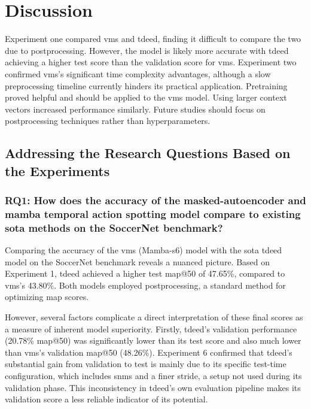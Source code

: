 \chapter{Discussion}
\label{chap:discussion}

Experiment one compared \acrfull{vms} and \acrfull{tdeed}, finding it difficult to compare the two due to postprocessing. However, the model is likely more accurate with \acrshort{tdeed} achieving a higher test score than the validation score for \acrshort{vms}. Experiment two confirmed \acrshort{vms}'s significant time complexity advantages, although a slow preprocessing timeline currently hinders its practical application. Pretraining proved helpful and should be applied to the \acrshort{vms} model. Using larger context vectors increased performance similarly. Future studies should focus on postprocessing techniques rather than hyperparameters. 

\section{Addressing the Research Questions Based on the Experiments}
\label{sec:addressing_rq_based_on_experiments}

\subsection{RQ1: How does the accuracy of the masked-autoencoder and mamba temporal action spotting model compare to existing \acrfull{sota} methods on the SoccerNet benchmark?}

Comparing the accuracy of the \acrshort{vms} (Mamba-\acrshort{s6}) model with the \acrshort{sota} \acrshort{tdeed} model on the SoccerNet benchmark reveals a nuanced picture. Based on Experiment 1, \acrshort{tdeed} achieved a higher test \acrshort{map}@50 of 47.65\%, compared to \acrshort{vms}'s 43.80\%. Both models employed postprocessing, a standard method for optimizing \acrshort{map} scores.

However, several factors complicate a direct interpretation of these final scores as a measure of inherent model superiority. Firstly, \acrshort{tdeed}'s validation performance (20.78\% \acrshort{map}@50) was significantly lower than its test score and also much lower than \acrshort{vms}'s validation \acrshort{map}@50 (48.26\%). Experiment 6 confirmed that \acrshort{tdeed}'s substantial gain from validation to test is mainly due to its specific test-time configuration, which includes \acrfull{snms} and a finer stride, a setup not used during its validation phase. This inconsistency in \acrshort{tdeed}'s own evaluation pipeline makes its validation score a less reliable indicator of its potential.

